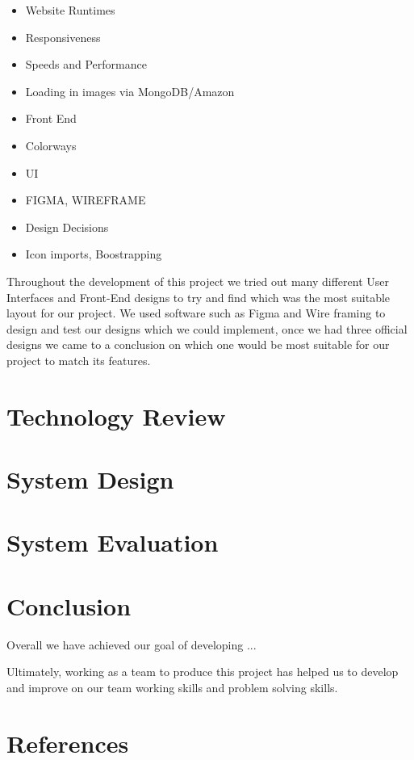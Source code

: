 \newline

\begin{itemize}
    \item Website Runtimes
    \item Responsiveness
    \item Speeds and Performance
    \item Loading in images via MongoDB/Amazon
\end{itemize}


\begin{itemize}
    \item Front End
    \item Colorways
    \item UI
    \item FIGMA, WIREFRAME
    \item Design Decisions
    \item Icon imports, Boostrapping
\end{itemize}

Throughout the development of this project we tried out many different User Interfaces and Front-End designs to try and find which was the most suitable layout for our project. We used software such as Figma and Wire framing to design and test our designs which we could implement, once we had three official designs we came to a conclusion on which one would be most suitable for our project to match its features.

\chapter{Technology Review}

\chapter{System Design}

\chapter{System Evaluation}


\chapter{Conclusion}
Overall we have achieved our goal of developing ...

Ultimately, working as a team to produce this project has helped us to develop and improve on our team working skills and problem solving skills.

\chapter{References}


